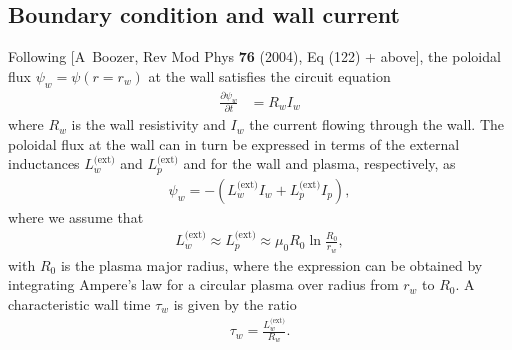 \documentclass[11pt,a4paper]{article}
\begin{document}
\subsection{Boundary condition and wall current}
Following [A~Boozer, Rev Mod Phys {\bf 76} (2004), Eq (122) + above], the poloidal flux $\psi_w = \psi(r=r_w)$ at the wall satisfies the circuit equation
\begin{align}
\frac{\partial \psi_w}{\partial t} &= R_w I_w
\end{align}
where $R_w$ is the wall resistivity and $I_w$ the current flowing through the wall. The poloidal flux at the wall can in turn be expressed in terms of the external inductances $L_w^\text{(ext)}$ and $L_p^\text{(ext)}$ and for the wall and plasma, respectively, as
\begin{align}
\psi_w = -(L_w^\text{(ext)} I_w + L_p^\text{(ext)} I_p),
\end{align}
where we assume that 
\begin{align}
L_w^\text{(ext)} \approx L_p^\text{(ext)} \approx \mu_0 R_0 \ln\frac{R_0}{r_w},
\end{align}
with $R_0$ is the plasma major radius, where the expression can be obtained by integrating Ampere's law for a circular plasma over radius from $r_w$ to $R_0$. A characteristic wall time $\tau_w$ is given by the ratio
\begin{align}
\tau_w = \frac{L_w^\text{(ext)}}{R_w}.
\end{align}
\end{document}
